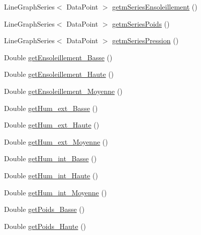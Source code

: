 \begin{DoxyCompactItemize}
\item 
Line\+Graph\+Series$<$ Data\+Point $>$ \hyperlink{classfr_1_1campus_1_1laurainc_1_1honeybee_1_1_ruche_afb6dfa76b8c8c35151face6a5fe32044}{getm\+Series\+Ensoleillement} ()
\item 
Line\+Graph\+Series$<$ Data\+Point $>$ \hyperlink{classfr_1_1campus_1_1laurainc_1_1honeybee_1_1_ruche_aebd7c24cbb596731671db1a9554c8351}{getm\+Series\+Poids} ()
\item 
Line\+Graph\+Series$<$ Data\+Point $>$ \hyperlink{classfr_1_1campus_1_1laurainc_1_1honeybee_1_1_ruche_a237f9b18ebb70839382bc2bfc237b5da}{getm\+Series\+Pression} ()
\item 
Double \hyperlink{classfr_1_1campus_1_1laurainc_1_1honeybee_1_1_ruche_ac7c7998ec56bfc71b6f1a240aec67cbc}{get\+Ensoleillement\+\_\+\+Basse} ()
\item 
Double \hyperlink{classfr_1_1campus_1_1laurainc_1_1honeybee_1_1_ruche_a0b0953f30bc0fff703abff84d55c696b}{get\+Ensoleillement\+\_\+\+Haute} ()
\item 
Double \hyperlink{classfr_1_1campus_1_1laurainc_1_1honeybee_1_1_ruche_ab516b3c8cee816884e2f23c863078837}{get\+Ensoleillement\+\_\+\+Moyenne} ()
\item 
Double \hyperlink{classfr_1_1campus_1_1laurainc_1_1honeybee_1_1_ruche_a1c94b1323990dac4de2af7e9b9c192ea}{get\+Hum\+\_\+ext\+\_\+\+Basse} ()
\item 
Double \hyperlink{classfr_1_1campus_1_1laurainc_1_1honeybee_1_1_ruche_a71dec356de4ad4da36031774815d6993}{get\+Hum\+\_\+ext\+\_\+\+Haute} ()
\item 
Double \hyperlink{classfr_1_1campus_1_1laurainc_1_1honeybee_1_1_ruche_a354b16d6aa62f6b8b147be86fc3ca772}{get\+Hum\+\_\+ext\+\_\+\+Moyenne} ()
\item 
Double \hyperlink{classfr_1_1campus_1_1laurainc_1_1honeybee_1_1_ruche_a57efc0899720f55778f4ed42157e4eb3}{get\+Hum\+\_\+int\+\_\+\+Basse} ()
\item 
Double \hyperlink{classfr_1_1campus_1_1laurainc_1_1honeybee_1_1_ruche_a7b4dfda126b3cb0c370e89ac8a646a9d}{get\+Hum\+\_\+int\+\_\+\+Haute} ()
\item 
Double \hyperlink{classfr_1_1campus_1_1laurainc_1_1honeybee_1_1_ruche_ac1662e5ea81b67877e487eced61603d3}{get\+Hum\+\_\+int\+\_\+\+Moyenne} ()
\item 
Double \hyperlink{classfr_1_1campus_1_1laurainc_1_1honeybee_1_1_ruche_a050f2a5a3ef1804df286dc94814ff66a}{get\+Poids\+\_\+\+Basse} ()
\item 
Double \hyperlink{classfr_1_1campus_1_1laurainc_1_1honeybee_1_1_ruche_aba72b70eaa0fd03c6534c22442a7ecea}{get\+Poids\+\_\+\+Haute} ()

\end{DoxyCompactItemize}
